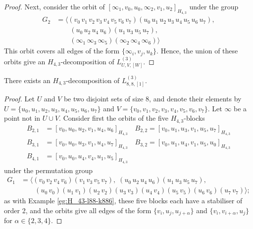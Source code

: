 \begin{subappendices}
\begin{proof}
Next, consider the orbit of $[\infty_1, v_0, u_0, \infty_2, v_1, u_2]_{H_{4,3}}$ under the group
\begin{align*}
    G_2 &= \langle
    (v_0 \, v_1 \, v_2 \, v_3 \, v_4 \, v_5 \, v_6 \, v_7)
    (u_0 \, u_1 \, u_2 \, u_3 \, u_4 \, u_5 \, u_6 \, u_7), \\
    & \quad \quad
    (u_0 \, u_2 \, u_4 \, u_6) (u_1 \, u_3 \, u_5 \, u_7), \\
    & \quad \quad
    (\infty_1 \, \infty_3 \, \infty_5) (\infty_2 \, \infty_4 \, \infty_6)
    \rangle
\end{align*}
This orbit covers all edges of the form $\{\infty_i, v_j, u_k\}$.
Hence, the union of these orbits give an $H_{4,3}$-decomposition of $L_{U,V,[W]}^{(3)}$.
\end{proof}


\begin{example} \label{eg:H_43-l88-k881}
There exists an $H_{4,3}$-decomposition of $L_{8,8,[1]}^{(3)}$.
\end{example}

\begin{proof}
Let $U$ and $V$ be two disjoint sets of size 8, and denote their elements by $U = \{u_0, u_1, u_2, u_3, u_4, u_5, u_6, u_7\}$ and $V = \{v_0, v_1, v_2, v_3, v_4, v_5, v_6, v_7\}$. Let $\infty$ be a point not in $U \cup V$.
Consider first the orbits of the five $H_{4,3}$-blocks
\begin{align*}
    B_{2,1} &= [v_0, u_0, u_2, v_1, u_4, u_6]_{H_{4,3}} \quad
    B_{2,2} = [v_0, u_1, u_3, v_1, u_5, u_7]_{H_{4,3}} \\
    B_{3,1} &= [v_0, u_0, u_3, v_1, u_4, u_7]_{H_{4,3}} \quad
    B_{3,2} = [v_0, u_1, u_4, v_1, u_5, u_0]_{H_{4,3}} \\
    B_{4,1} &= [v_0, u_0, u_4, v_4, u_1, u_5]_{H_{4,3}}
\end{align*}
under the permutation group
\begin{align*}
    G_1 &= \langle (v_0 \, v_2 \, v_4 \, v_6) (v_1 \, v_3 \, v_5 \, v_7),
    \; (u_0 \, u_2 \, u_4 \, u_6) (u_1 \, u_3 \, u_5 \, u_7), \\
    & \quad \quad (u_0 \, v_0) (u_1 \, v_1) (u_2 \, v_2) (u_3 \, v_3) (u_4 \, v_4)
    (u_5 \, v_5) (u_6 \, v_6) (u_7 \, v_7) \rangle;
\end{align*}
as with Example \ref{eg:H_43-l88-k886}, these five blocks each have a stabiliser of order 2,
  and the orbits give all edges of the form $\{v_i, u_j, u_{j+\alpha}\}$ and $\{v_i, v_{i+\alpha}, u_j\}$ for $\alpha \in \{2,3,4\}$.


\end{proof}
\end{subappendices}

